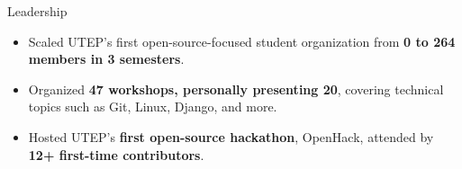 \documentclass{resume} %
\begin{document}
\begin{workSection}{Leadership}
    
    \customItem[
    	title=President \& Founder - \href{https://www.instagram.com/foss.utep/}{\textbf{Free and Open Source Software Club at UTEP} \faExternalLink},
    	duration=December 2023 - March 2025
    ]
    \begin{itemize}
    	\vspace{-0.5em}
    	\itemsep -6pt {}
    	\item Scaled UTEP's first open-source-focused student organization from \textbf{0 to 264 members in 3 semesters}. %
		\item Organized \textbf{47 workshops, personally presenting 20}, covering technical topics such as Git, Linux, Django, and more.
		\item Hosted UTEP's \textbf{first open-source hackathon}, OpenHack, attended by \textbf{12+ first-time contributors}.
    \end{itemize}


\end{workSection}
\end{document}
